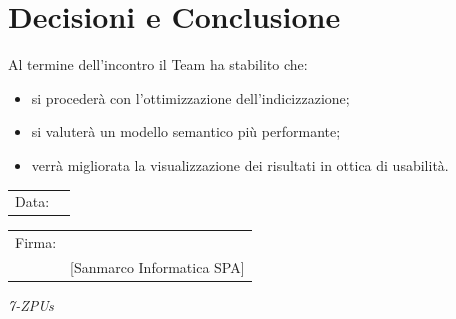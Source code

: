 \documentclass[a4paper,12pt]{article}
\begin{document}
\section{Decisioni e Conclusione}

Al termine dell’incontro il Team ha stabilito che:
\begin{itemize}
    \item si procederà con l’ottimizzazione dell’indicizzazione;
    \item si valuterà un modello semantico più performante;
    \item verrà migliorata la visualizzazione dei risultati in ottica di usabilità.
\end{itemize}

\vfill

\begin{flushleft}
\begin{tabular}{@{}p{0.5in}p{2in}@{}}
Data: & \hrulefill \\
\end{tabular}

\vspace{1em}

\begin{tabular}{@{}p{0.5in}p{2in}@{}}
Firma: & \hrulefill \\
& [Sanmarco Informatica SPA] \\
\end{tabular}
\end{flushleft}

\begin{flushright}
\textit{7-ZPUs}
\end{flushright}
\end{document}
